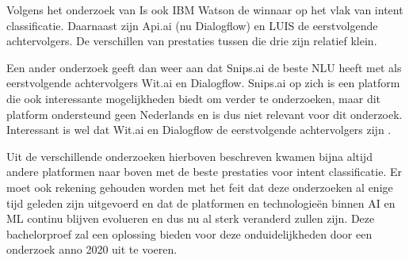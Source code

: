 Volgens het onderzoek van \textcite{Savenkov2017} Is ook IBM Watson de winnaar op het vlak van intent classificatie. Daarnaast zijn Api.ai (nu Dialogflow) en LUIS de eerstvolgende achtervolgers. De verschillen van prestaties tussen die drie zijn relatief klein.

Een ander onderzoek geeft dan weer aan dat Snips.ai de beste NLU heeft met als eerstvolgende achtervolgers Wit.ai en Dialogflow. Snips.ai op zich is een platform die ook interessante mogelijkheden biedt om verder te onderzoeken, maar dit platform ondersteund geen Nederlands en is dus niet relevant voor dit onderzoek. Interessant is wel dat Wit.ai en Dialogflow de eerstvolgende achtervolgers zijn \autocite{Coucke2017}.

Uit de verschillende onderzoeken hierboven beschreven kwamen bijna altijd andere platformen naar boven met de beste prestaties voor intent classificatie. Er moet ook rekening gehouden worden met het feit dat deze onderzoeken al enige tijd geleden zijn uitgevoerd en dat de platformen en technologieën binnen AI en ML continu blijven evolueren en dus nu al sterk veranderd zullen zijn. Deze bachelorproef zal een oplossing bieden voor deze onduidelijkheden door een onderzoek anno 2020 uit te voeren.
















